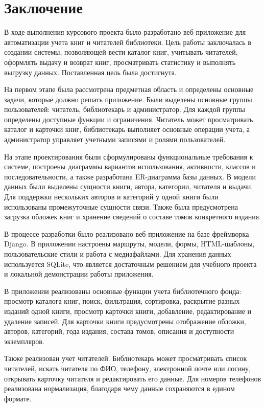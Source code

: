 \section*{Заключение}

В ходе выполнения курсового проекта было разработано веб-приложение для автоматизации учета книг и читателей библиотеки. Цель работы заключалась в создании системы, позволяющей вести каталог книг, учитывать читателей, оформлять выдачу и возврат книг, просматривать статистику и выполнять выгрузку данных. Поставленная цель была достигнута.

На первом этапе была рассмотрена предметная область и определены основные задачи, которые должно решать приложение. Были выделены основные группы пользователей: читатель, библиотекарь и администратор. Для каждой группы определены доступные функции и ограничения. Читатель может просматривать каталог и карточки книг, библиотекарь выполняет основные операции учета, а администратор управляет учетными записями и ролями пользователей.

На этапе проектирования были сформулированы функциональные требования к системе, построены диаграммы вариантов использования, активности, классов и последовательности, а также разработана ER-диаграмма базы данных. В модели данных были выделены сущности книги, автора, категории, читателя и выдачи. Для поддержки нескольких авторов и категорий у одной книги были использованы промежуточные сущности связи. Также была предусмотрена загрузка обложек книг и хранение сведений о составе томов конкретного издания.

В процессе разработки было реализовано веб-приложение на базе фреймворка Django. В приложении настроены маршруты, модели, формы, HTML-шаблоны, пользовательские стили и работа с медиафайлами. Для хранения данных используется SQLite, что является достаточным решением для учебного проекта и локальной демонстрации работы приложения.

В приложении реализованы основные функции учета библиотечного фонда: просмотр каталога книг, поиск, фильтрация, сортировка, раскрытие разных изданий одной книги, просмотр карточки книги, добавление, редактирование и удаление записей. Для карточки книги предусмотрены отображение обложки, авторов, категорий, года издания, состава томов, описания и доступности экземпляров.

Также реализован учет читателей. Библиотекарь может просматривать список читателей, искать читателя по ФИО, телефону, электронной почте или логину, открывать карточку читателя и редактировать его данные. Для номеров телефонов реализована нормализация, благодаря чему данные сохраняются в едином формате.

